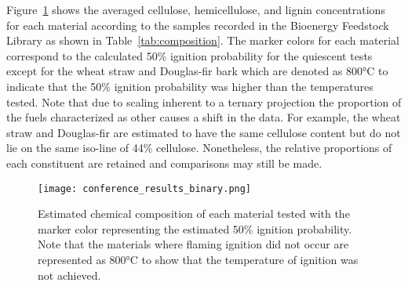     Figure~\ref{fig:composition_plot} shows the averaged cellulose, hemicellulose, and lignin concentrations for each material according to the samples recorded in the Bioenergy Feedstock Library as shown in Table~\ref{tab:composition}. The marker colors for each material correspond to the calculated 50\% ignition probability for the quiescent tests except for the wheat straw and Douglas-fir bark which are denoted as 800\si{\celsius} to indicate that the 50\% ignition probability was higher than the temperatures tested.  Note that due to scaling inherent to a ternary projection the proportion of the fuels characterized as other causes a shift in the data. For example, the wheat straw and Douglas-fir are estimated to have the same cellulose content but do not lie on the same iso-line of 44\% cellulose. Nonetheless, the relative proportions of each constituent are retained and comparisons may still be made. 
        \begin{figure}[htpb]
            \centering
            \texttt{[image: conference\_results\_binary.png]}
            \caption{Estimated chemical composition of each material tested with the marker color representing the estimated 50\% ignition probability. Note that the materials where flaming ignition did not occur are represented as 800\si{\celsius} to show that the temperature of ignition was not achieved.}
            \label{fig:composition_plot}
        \end{figure}

